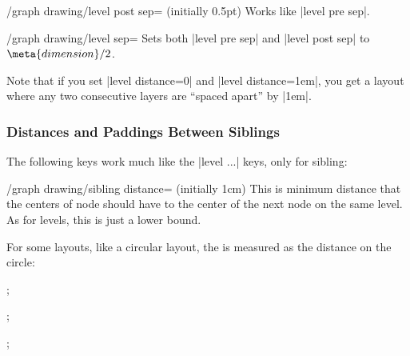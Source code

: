 \begin{key}{/graph drawing/level post sep= (initially 0.5pt)}
  Works like |level pre sep|.
\end{key}

\begin{key}{/graph drawing/level sep=}
  Sets both |level pre sep| and |level post sep| to
  $\meta{dimension}/2$.
\end{key}

Note that if you set |level distance=0| and |level distance=1em|, you get
a layout where any two consecutive layers are ``spaced apart'' by
|1em|.


\subsubsection{Distances and Paddings Between Siblings}

The following keys work much like the |level ...| keys, only for
sibling:

\begin{key}{/graph drawing/sibling distance= (initially 1cm)}
  This is minimum distance that the centers of node should have to the
  center of the next node on the same level. As for levels, this is
  just a lower bound.

  For some layouts, like a circular layout, the  is
  measured as the distance on the circle:
\begin{codeexample}[]
\tikz {};  
\end{codeexample}
\begin{codeexample}[]
\tikz {};  
\end{codeexample}
\begin{codeexample}[]
\tikz {};  
\end{codeexample}
\end{key}



